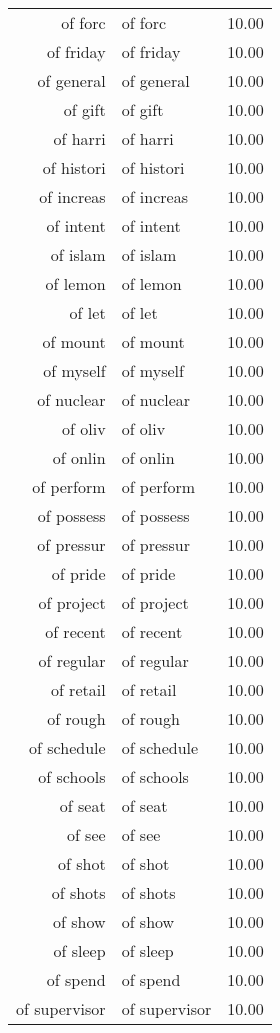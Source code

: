 \begin{table}[ht]
\begin{tabular}{rlr}
  of forc & of forc & 10.00 \\ 
  of friday & of friday & 10.00 \\ 
  of general & of general & 10.00 \\ 
  of gift & of gift & 10.00 \\ 
  of harri & of harri & 10.00 \\ 
  of histori & of histori & 10.00 \\ 
  of increas & of increas & 10.00 \\ 
  of intent & of intent & 10.00 \\ 
  of islam & of islam & 10.00 \\ 
  of lemon & of lemon & 10.00 \\ 
  of let & of let & 10.00 \\ 
  of mount & of mount & 10.00 \\ 
  of myself & of myself & 10.00 \\ 
  of nuclear & of nuclear & 10.00 \\ 
  of oliv & of oliv & 10.00 \\ 
  of onlin & of onlin & 10.00 \\ 
  of perform & of perform & 10.00 \\ 
  of possess & of possess & 10.00 \\ 
  of pressur & of pressur & 10.00 \\ 
  of pride & of pride & 10.00 \\ 
  of project & of project & 10.00 \\ 
  of recent & of recent & 10.00 \\ 
  of regular & of regular & 10.00 \\ 
  of retail & of retail & 10.00 \\ 
  of rough & of rough & 10.00 \\ 
  of schedule & of schedule & 10.00 \\ 
  of schools & of schools & 10.00 \\ 
  of seat & of seat & 10.00 \\ 
  of see & of see & 10.00 \\ 
  of shot & of shot & 10.00 \\ 
  of shots & of shots & 10.00 \\ 
  of show & of show & 10.00 \\ 
  of sleep & of sleep & 10.00 \\ 
  of spend & of spend & 10.00 \\ 
  of supervisor & of supervisor & 10.00 \\ 

\end{tabular}
\end{table}

